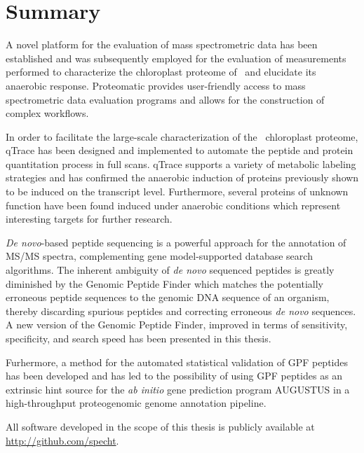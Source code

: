 \cleardoublepage
\chapter{Summary}

A novel platform for the evaluation of mass spectrometric data has been
established and was subsequently employed for the evaluation of measurements
performed to characterize the chloroplast proteome of \cre~and elucidate
its anaerobic response.
Proteomatic provides user-friendly access to mass spectrometric data 
evaluation programs and allows for the construction of complex workflows.

In order to facilitate the large-scale characterization of the \cre~chloroplast
proteome, qTrace has been designed and implemented to automate the peptide and 
protein quantitation process in full scans.
qTrace supports a variety of metabolic labeling strategies and has 
confirmed the anaerobic induction of proteins previously shown to be induced on
the transcript level.
Furthermore, several proteins of unknown function have been found induced
under anaerobic conditions which represent interesting targets for further 
research.

{\em De novo}-based peptide sequencing is a powerful approach for the annotation
of MS/MS spectra, complementing gene model-supported database search algorithms.
The inherent ambiguity of {\em de novo} sequenced peptides is greatly diminished
by the Genomic Peptide Finder which matches the potentially erroneous
peptide sequences to the genomic DNA sequence of an organism, thereby discarding
spurious peptides and correcting erroneous {\em de novo} sequences.
A new version of the Genomic Peptide Finder, improved in terms of sensitivity, 
specificity, and search speed has been presented in this thesis.

Furhermore, a method for the automated statistical validation of GPF peptides
has been developed and has led to the possibility of using GPF peptides as
an extrinsic hint source for the {\em ab initio} gene prediction program 
AUGUSTUS in a high-throughput proteogenomic genome annotation pipeline.

All software developed in the scope of this thesis is publicly available
at \href{http://github.com/specht}{http://github.com/specht}.
